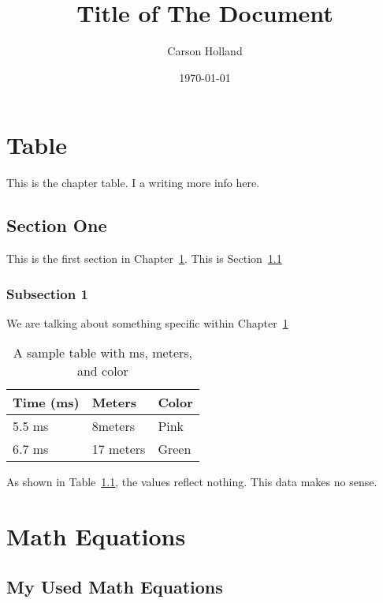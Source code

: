 \documentclass[12pt]{report}
\title{Title of The Document}
\author{Carson Holland}
\date{\today}
\begin{document}
\maketitle

\tableofcontents

\chapter{Table}
\label{chapter:table}

This is the chapter table. I a writing more info here.

\section{Section One}
\label{section:one}
This is the first section in Chapter~\ref{chapter:table}. This is Section~\ref{section:one}

\subsection{Subsection 1}
We are talking about something specific within Chapter~\ref{chapter:table}


\begin{table}[h!]
\begin{tabular}{| l | l | l |} \hline
Time (ms) & Meters  & Color  \\ \hline
5.5 ms  & 8meters  & Pink  \\ \hline
6.7 ms & 17 meters & Green \\ \hline
\end{tabular}
\caption{A sample table with ms, meters, and color}
\label{table:my_data}
\end{table}

As shown in Table~\ref{table:my_data}, the values reflect nothing. This data makes no sense.


\chapter{Math Equations}
\label{chapter:math_equations}

\section{My Used Math Equations}
\end{document}
